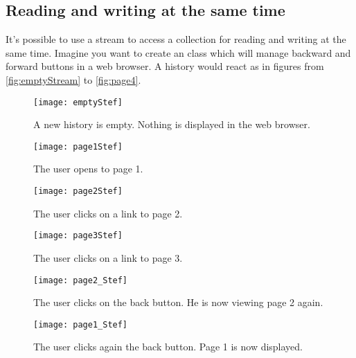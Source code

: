 \documentclass[a4paper,10pt,twoside]{book}
\begin{document}
\subsection{Reading and writing at the same time}

It's possible to use a stream to access a collection for reading and
writing at the same time.
Imagine you want to create an  class which will manage
backward and forward buttons in a web browser.
A history would react as in figures from \ref{fig:emptyStream} to
\ref{fig:page4}.

\begin{figure}[!ht]
\centerline{\texttt{[image: emptyStef]}}
\caption{A new history is empty. Nothing is displayed in the web browser.}
\vspace{.2in}
\end{figure}

\begin{figure}[!ht]
\centerline{\texttt{[image: page1Stef]}}
\caption{The user opens to page 1.}
\vspace{.2in}
\end{figure}

\begin{figure}[!ht]
\centerline{\texttt{[image: page2Stef]}}
\caption{The user clicks on a link to page 2.}
\vspace{.2in}
\end{figure}

\begin{figure}[!ht]
\centerline{\texttt{[image: page3Stef]}}
\caption{The user clicks on a link to page 3.}
\vspace{.2in}
\end{figure}

\begin{figure}[!ht]
\centerline{\texttt{[image: page2\_Stef]}}
\caption{The user clicks on the back button. He is now viewing page 2 again.}
\vspace{.2in}
\end{figure}

\begin{figure}[!ht]
\centerline{\texttt{[image: page1\_Stef]}}
\caption{The user clicks again the back button. Page 1 is now displayed.}
\vspace{.2in}
\end{figure}
\end{document}
